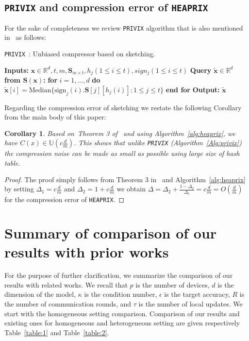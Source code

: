 \documentclass[11pt]{article}
\newtheorem{corollary}{Corollary}
\begin{document}
\subsection{\texttt{PRIVIX} and compression error of \texttt{HEAPRIX}}
For the sake of completeness we review \texttt{PRIVIX} algorithm that is also mentioned in~\citet{li2019privacy} as follows:

\begin{algorithm}[H]
\caption{\texttt{PRIVIX}~\citep{li2019privacy}: Unbiased compressor based on sketching. }\label{Alg:privix}
\begin{algorithmic}[1]
\STATE \textbf{Inputs:} $\boldsymbol{x}\in\mathbb{R}^{d}, t, m, \mathbf{S}_{m\times t}, h_j (1\leq i\leq t), sign_j (1\leq i\leq t)$
\STATE \textbf{Query} $\tilde{\boldsymbol{x}}\in\mathbb{R}^d$ \textbf{from $\mathbf{S(\boldsymbol{x})}$:}
\STATE \textbf{for} $i=1,\ldots,d$ \textbf{do}
\STATE \quad\quad ${\tilde{\boldsymbol{x}}}[i]=\text{Median}\{\text{sign}_j(i).\mathbf{S}[j][h_j(i)]:1\leq j\leq t\}$ 
\STATE \textbf{end for}
\STATE \textbf{Output:} ${\tilde{\boldsymbol{x}}}$
\end{algorithmic}
\end{algorithm}



Regarding the compression error of sketching we restate the following Corollary from the main body of this paper:
\begin{corollary}
Based on~Theorem 3 of~\citep{horvath2020better} and using Algorithm~\ref{alg:heaprix}, we have $C(x)\in \mathbb{U}(c \frac{d}{m})$. This shows that unlike \texttt{PRIVIX} (Algorithm~\ref{Alg:privix}) the compression noise can be made as small as possible using large size of hash table.
\end{corollary}

\begin{proof}
The proof simply follows from Theorem 3 in~\citet{horvath2020better} and Algorithm~\ref{alg:heaprix} by setting $\Delta_1=c\frac{d}{m}$ and $\Delta_2=1+c\frac{d}{m}$ we obtain $\Delta=\Delta_2+\frac{1-\Delta_2}{\Delta_1}=c\frac{d}{m}=O\left(\frac{d}{m}\right)$ for the compression error of \texttt{HEAPRIX}. 
\end{proof}


\section{Summary of comparison of our results with prior works}\label{app:comparison}
For the purpose of further clarification, we summarize the comparison of our results with related works. 
We recall that $p$ is the number of devices, $d$ is the dimension of the model, $\kappa$ is the condition number, $\epsilon$ is the target accuracy, $R$ is  the number of communication rounds, and $\tau$ is the number of local updates. 
We start with the homogeneous setting comparison.
Comparison of our results and existing ones for homogeneous and heterogeneous setting are given respectively Table~\ref{table:1} and Table~\ref{table:2}.
\end{document}
